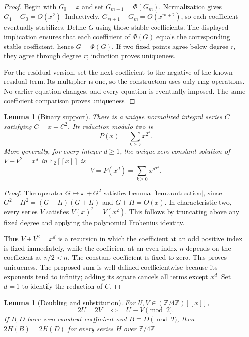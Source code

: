 \documentclass[11pt,a4paper]{article}
\newtheorem{lemma}[theorem]{Lemma}
\theoremstyle{remark}
\newcommand{\Z}{\mathbb Z}
\newcommand{\F}{\mathbb F}
\newcommand{\ps}[1]{#1[[x]]}
\begin{document}
\begin{proof}
Begin with $G_0=x$ and set $G_{m+1}=\Phi(G_m)$. Normalization gives
$G_1-G_0=O(x^2)$. Inductively,
$G_{m+1}-G_m=O(x^{m+2})$, so each coefficient eventually stabilizes.
Define $G$ using those stable coefficients. The displayed implication
ensures that each coefficient of $\Phi(G)$ equals the corresponding stable
coefficient, hence $G=\Phi(G)$. If two fixed points agree below degree
$r$, they agree through degree $r$; induction proves uniqueness.

For the residual version, set the next coefficient to the negative of the
known residual term. Its multiplier is one, so the construction uses only
ring operations. No earlier equation changes, and every equation is
eventually imposed. The same coefficient comparison proves uniqueness.
\end{proof}

\begin{lemma}[Binary support]\label{lem:binary}
There is a unique normalized integral series $C$ satisfying $C=x+C^2$.
Its reduction modulo two is
\[
 P(x)=\sum_{k\ge0}x^{2^k}.
\]
More generally, for every integer $d\ge1$, the unique zero-constant
solution of $V+V^2=x^d$ in $\ps{\F_2}$ is
\[
 V=P(x^d)=\sum_{k\ge0}x^{d2^k}.
\]
\end{lemma}

\begin{proof}
The operator $G\mapsto x+G^2$ satisfies Lemma~\ref{lem:contraction},
since $G^2-H^2=(G-H)(G+H)$ and $G+H=O(x)$. In characteristic two,
every series $V$ satisfies $V(x)^2=V(x^2)$. This follows by truncating
above any fixed degree and applying the polynomial Frobenius identity.

Thus $V+V^2=x^d$ is a recursion in which the coefficient at an odd positive
index is fixed immediately, while the coefficient at an even index $n$
depends on the coefficient at $n/2<n$. The constant coefficient is fixed
to zero. This proves uniqueness. The proposed sum is well-defined
coefficientwise because its exponents tend to infinity; adding its square
cancels all terms except $x^d$. Set $d=1$ to identify the reduction of $C$.
\end{proof}

\begin{lemma}[Doubling and substitution]\label{lem:double}
For $U,V\in(\Z/4\Z)[[x]]$,
\[
 2U=2V\quad\Longleftrightarrow\quad
 U\equiv V\pmod2.
\]
If $B,D$ have zero constant coefficient and $B\equiv D\pmod2$, then
$2H(B)=2H(D)$ for every series $H$ over $\Z/4\Z$.
\end{lemma}
\end{document}
